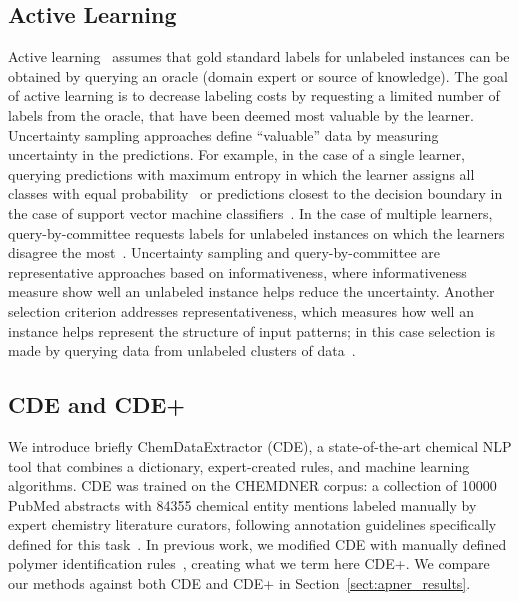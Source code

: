 \subsection{Active Learning}\label{sec:active}
Active learning~\cite{zhou2017brief} assumes that gold standard labels for unlabeled instances can be obtained by
querying an oracle (domain expert or source of knowledge).
The goal of active learning is to decrease labeling costs by requesting a limited number of labels from the oracle, that have been deemed most valuable by the learner.
Uncertainty sampling approaches define ``valuable'' data by measuring uncertainty in the predictions.
For example, in the case of a single learner, querying predictions with maximum entropy in which the learner assigns all classes with equal probability~\cite{lewis1994heterogeneous} or predictions closest to the decision boundary in the case of support vector machine classifiers~\cite{campbell2000query}.
In the case of multiple learners, query-by-committee requests labels for unlabeled instances on which the learners disagree the most~\cite{seung1992query}.
Uncertainty sampling and query-by-committee are representative approaches based on informativeness, where informativeness measure show well an unlabeled instance helps reduce the uncertainty. 
Another selection criterion addresses representativeness, which measures how well an instance helps represent the structure of input patterns; in this case selection is made by querying data from unlabeled clusters of data~\cite{nguyen2004active,dasgupta2008hierarchical}.

\subsection{CDE and CDE+}\label{sec:cde}
We introduce briefly ChemDataExtractor (CDE), 
a state-of-the-art chemical NLP tool that combines a dictionary, expert-created
rules, and machine learning algorithms.
CDE was trained on the CHEMDNER corpus:
a collection of \num{10000} PubMed abstracts with \num{84355} chemical entity mentions labeled manually by expert chemistry literature curators, following annotation guidelines specifically defined for this task~\cite{krallinger2015chemdner}.
In previous work, we modified CDE with
manually defined polymer identification rules~\cite{tchoua2017towards}, creating what we term here CDE+.
We compare our methods against both CDE and CDE+ in Section~\ref{sect:apner_results}.

